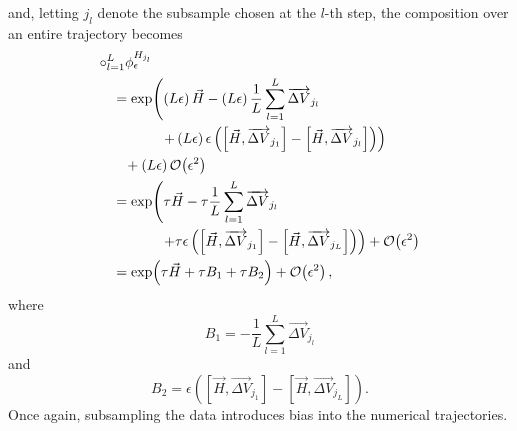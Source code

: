 \documentclass{article}
\begin{document}
%
and, letting $j_{l}$ denote the subsample chosen at the $l$-th step, the composition over
an entire trajectory becomes
%
\begin{align*}
\circ_{l = 1}^{L} \phi^{H_{j_{l}}}_{\epsilon}
& \\
& \hspace{-10mm} =
\exp \! \left( 
\left( L \epsilon \right) \vec{H} 
- \left( L \epsilon \right) \frac{1}{L} \sum_{l = 1}^{L}  \overrightarrow{ \Delta V}_{j_{l}}
\right.
\\
& \hspace{2mm} \left.
+ \left( L \epsilon \right) \epsilon 
\left( \left[ \vec{H}, \overrightarrow{ \Delta V}_{j_{1}} \right] 
- \left[ \vec{H}, \overrightarrow{ \Delta V}_{j_{l}} \right] \right) 
\right)
\\
& \hspace{-7mm}
+ \left(L \epsilon \right) \mathcal{O} \! \left( \epsilon^{2} \right)
\\
& \hspace{-10mm} =
\exp \! \left( \tau \vec{H} - \tau \frac{1}{L} \sum_{l = 1}^{L} \overrightarrow{ \Delta V}_{j_{l}}
\right.
\\
& \hspace{2mm} \left.
+ \tau \epsilon 
\left( \left[ \vec{H}, \overrightarrow{ \Delta V}_{j_{1}} \right] 
- \left[ \vec{H}, \overrightarrow{ \Delta V}_{j_{L}} \right] \right)
\right)
+ \mathcal{O} \! \left( \epsilon^{2} \right)
\\
& \hspace{-10mm} =
\exp \! \left( \tau \vec{H} + \tau B_{1} + \tau B_{2} \right)
+ \mathcal{O} \! \left( \epsilon^{2} \right),
\end{align*}
%
where
%
\begin{equation*}
B_{1} = - \frac{1}{L} \sum_{l = 1}^{L} \overrightarrow{ \Delta V}_{j_{l}}
\end{equation*}
%
and
%
\begin{equation*}
B_{2} = \epsilon 
\left( \left[ \vec{H}, \overrightarrow{ \Delta V}_{j_{1}} \right] 
- \left[ \vec{H}, \overrightarrow{ \Delta V}_{j_{L}} \right] \right).
\end{equation*}
%
Once again, subsampling the data introduces bias into the numerical trajectories.
\end{document}
